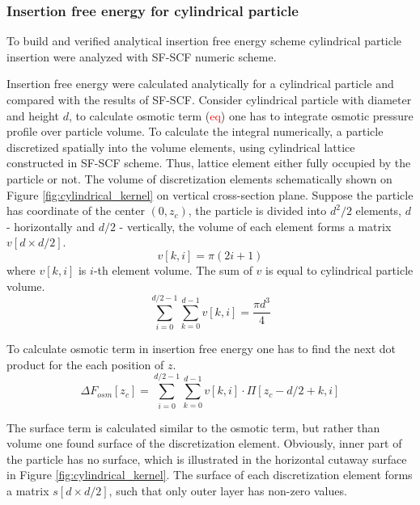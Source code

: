 \documentclass[12pt, a4paper]{article}
\newcommand\todo[1]{\textcolor{red}{#1}}
\begin{document}
\subsubsection{Insertion free energy for cylindrical particle}

To build and verified analytical insertion free energy scheme cylindrical particle insertion were analyzed with SF-SCF numeric scheme.

Insertion free energy were calculated analytically for a cylindrical particle and compared with the results of SF-SCF.
Consider cylindrical particle with diameter and height $d$, to calculate osmotic term (\todo{eq}) one has to integrate osmotic pressure profile over particle volume.
To calculate the integral numerically, a particle discretized spatially into the volume elements, using cylindrical lattice constructed in SF-SCF scheme.
Thus, lattice element either fully occupied by the particle or not.
The volume of discretization elements schematically shown on Figure \ref{fig:cylindrical_kernel} on vertical cross-section plane.
Suppose the particle has coordinate of the center ${(0, z_c)}$, the particle is divided into $d^2/2$ elements, $d$ - horizontally and $d/2$ - vertically, the volume of each element forms a matrix $v[d \times d/2]$.
\begin{equation}
    v[k,i] = \pi(2i+1)
\end{equation}
where $v[k,i]$ is $i$-th element volume.
The sum of $v$ is equal to cylindrical particle volume.
\begin{equation}
    \sum_{i=0}^{d/2-1} \sum_{k=0}^{d-1} v[k,i] = \frac{\pi d^3}{4}
\end{equation}

To calculate osmotic term in insertion free energy one has to find the next dot product for the each position of $z$.
\begin{equation}
    \Delta F_{osm}[z_c] = \sum_{i=0}^{d/2-1} \sum_{k=0}^{d-1} v[k,i] \cdot \Pi[z_c-d/2+k, i]
\end{equation}


The surface term is calculated similar to the osmotic term, but rather than volume one found surface of the discretization element. 
Obviously, inner part of the particle has no surface, which is illustrated in the horizontal cutaway surface in Figure \ref{fig:cylindrical_kernel}.
The surface of each discretization element forms a matrix $s[d \times d/2]$, such that only outer layer has non-zero values.
\end{document}
